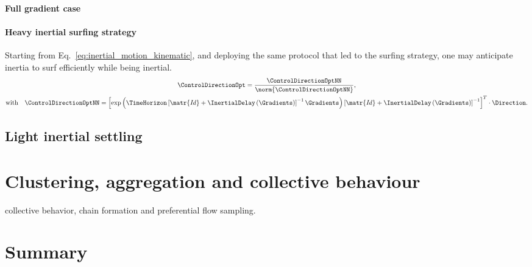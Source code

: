 \paragraph{Full gradient case}

\paragraph{Heavy inertial surfing strategy}

Starting from Eq.~\eqref{eq:inertial_motion_kinematic}, and deploying the same protocol that led to the surfing strategy, one may anticipate inertia to surf efficiently while being inertial.
\begin{multline}
	\label{turb:eq:surfing_swimming_direction_final}
	\ControlDirectionOpt = \frac{\ControlDirectionOptNN}{\norm{\ControlDirectionOptNN}}, \\ 
	\text{with} \quad \ControlDirectionOptNN = \left[ \exp \left( \TimeHorizon \left[ \matr{\mathit{Id}} + \InertialDelay \left(\Gradients\right) \right]^{-1} \Gradients \right) \left[ \matr{\mathit{Id}} + \InertialDelay \left(\Gradients\right) \right]^{-1} \right]^T \cdot \Direction.
\end{multline}

\subsection{Light inertial settling}

\citep{maxey1987motion, van2017enhanced}

\section{Clustering, aggregation and collective behaviour}

\citep{lovecchio2019chain} collective behavior, chain formation and preferential flow sampling.


\section{Summary}
